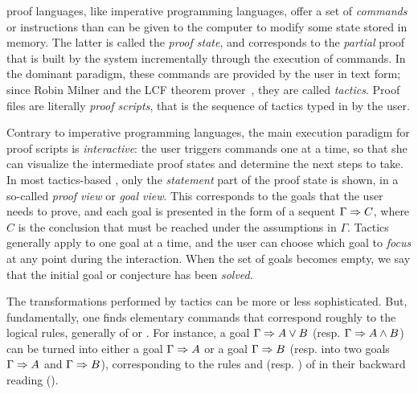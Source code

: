 \begin{description}[labelsep=0pt]
  \item[Imperative~]proof languages, like imperative programming languages,
  offer a set of \emph{commands} or instructions than can be given to the
  computer to modify some state stored in memory. The latter is called the
  \emph{proof state}, and corresponds to the \emph{partial} proof that is built
  by the system incrementally through the execution of commands. In the dominant
  paradigm, these commands are provided by the user in text form; since Robin
  Milner and the LCF theorem prover~, they
  are called \emph{tactics}. Proof files are literally \emph{proof scripts},
  that is the sequence of tactics typed in by the user.
  
  Contrary to imperative programming languages, the main execution paradigm for
  proof scripts is \emph{interactive}: the user triggers commands one at a time,
  so that she can visualize the intermediate proof states and determine the next
  steps to take. In most tactics-based ,
  only the \emph{statement} part of the proof state is shown, in a so-called
  \emph{proof view} or \emph{goal view}. This corresponds to the goals that the
  user needs to prove, and each goal is presented in the form of a sequent
  $\Gamma \Rightarrow C$, where $C$ is the conclusion that must be reached under the
  assumptions in $\Gamma$. Tactics generally apply to one goal at a time, and
  the user can choose which goal to \emph{focus} at any point during the
  interaction. When the set of goals becomes empty, we say that the initial goal
  or conjecture has been \emph{solved}.

  The transformations performed by tactics can be more or less sophisticated.
  But, fundamentally, one finds elementary commands that correspond roughly to
  the logical rules, generally of  or . For
  instance, a goal $\Gamma\Rightarrow A\lor B$ (resp. $\Gamma\Rightarrow A\land B$) can be
  turned into either a goal $\Gamma\Rightarrow A$ or a goal $\Gamma\Rightarrow B$ (resp. into
  two goals $\Gamma\Rightarrow A$ and $\Gamma\Rightarrow B$), corresponding to the rules
   and  (resp. ) of  in their
  backward reading ().


\end{description}
